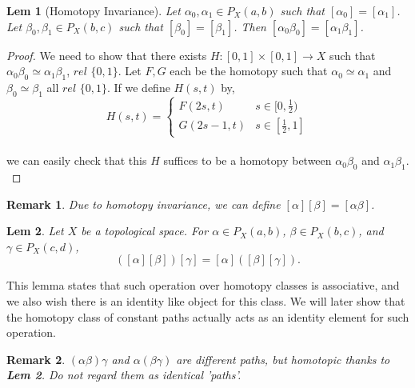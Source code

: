 \documentclass[paper=a4, fontsize=11pt]{scrartcl}
\newtheorem{lemma}{Lem}
\newtheorem*{remark}{Remark}
\begin{document}
\begin{lemma}[Homotopy Invariance]
	Let $\alpha_0,\alpha_1 \in P_X(a,b)$ such that $[\alpha_0]=[\alpha_1]$. Let $\beta_0,\beta_1 \in P_X(b,c)$ such that $[\beta_0]=[\beta_1]$. Then $[\alpha_0\beta_0]=[\alpha_1\beta_1]$.\\
\end{lemma}

\begin{proof}
	We need to show that there exists $H:[0,1]\times[0,1]\to X$ such that $\alpha_0\beta_0 \simeq \alpha_1\beta_1$, $rel$ $\{0,1\}$. Let $F,G$ each be the homotopy such that $\alpha_0 \simeq \alpha_1$ and $\beta_0 \simeq \beta_1$ all $rel$ $\{0,1\}$. If we define $H(s,t)$ by, \\
	\begin{equation}\nonumber
		H(s,t) =
		\begin{cases}
		 F(2s,t) & s\in [0,\frac{1}{2})\\
		 G(2s-1,t) & s \in [\frac{1}{2},1]
		\end{cases}
	\end{equation}\\
	 we can easily check that this $H$ suffices to be a homotopy between $\alpha_0 \beta_0$ and $\alpha_1\beta_1$.\\
\end{proof}

\begin{remark}
	Due to homotopy invariance, we can define $[\alpha][\beta]=[\alpha\beta]$.\\
\end{remark}

\begin{lemma}
	Let $X$ be a topological space. For $\alpha\in P_X(a,b)$, $\beta \in P_X(b,c)$, and $\gamma \in P_X(c,d)$, \\
	\begin{equation}\nonumber
		([\alpha][\beta])[\gamma] = [\alpha]([\beta][\gamma]).
	\end{equation}
\end{lemma}
\vspace{0.15in}
This lemma states that such operation over homotopy classes is associative, and we also wish there is an identity like object for this class. We will later show that the homotopy class of constant paths actually acts as an identity element for such operation.\\
\begin{remark}
	$(\alpha\beta)\gamma$ and $\alpha(\beta\gamma)$ are different paths, but homotopic thanks to \textbf{Lem 2}. Do not regard them as identical 'paths'. \\
\end{remark}
\end{document}
